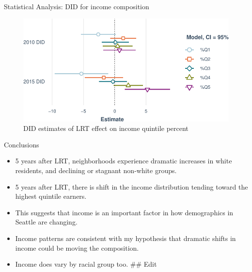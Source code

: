 \documentclass[11pt,ignorenonframetext,]{beamer}
\providecommand{\tightlist}{%
  \setlength{\itemsep}{0pt}\setlength{\parskip}{0pt}}
\begin{document}
\begin{frame}{Statistical Analysis: DID for income composition}
\protect\hypertarget{statistical-analysis-did-for-income-composition}{}

\begin{figure}
\centering
\includegraphics{csde_talk_files/figure-beamer/unnamed-chunk-13-1.pdf}
\caption{DID estimates of LRT effect on income quintile percent}
\end{figure}

\end{frame}

\begin{frame}{Conclusions}
\protect\hypertarget{conclusions}{}

\begin{itemize}
\tightlist
\item
  5 years after LRT, neighborhoods experience dramatic increases in
  white residents, and declining or stagnant non-white groups.
\item
  5 years after LRT, there is shift in the income distribution tending
  toward the highest quintile earners.\\
\item
  This suggests that income is an important factor in how demographics
  in Seattle are changing.
\item
  Income patterns are consistent with my hypothesis that dramatic shifts
  in income could be moving the composition.
\item
  Income does vary by racial group too. \#\# Edit
\end{itemize}

\end{frame}
\end{document}

